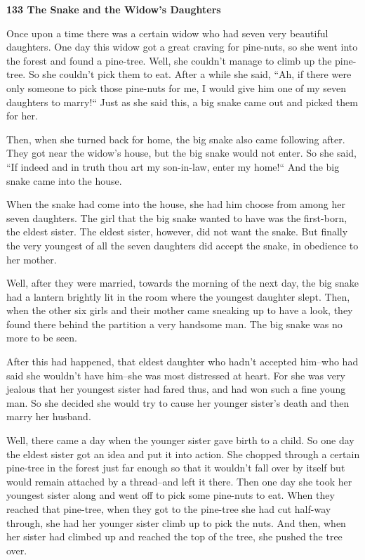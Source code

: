 
\textbf{133 The Snake and the Widow's Daughters}

Once upon a time there was a certain widow who had seven very beautiful daughters.
One day this widow got a great craving for pine-nuts, so she went into the forest
and found a pine-tree. Well, she couldn't manage to climb up the pine-tree. So
she couldn't pick them to eat. After a while she said, ``Ah, if there were
only someone to pick those pine-nuts for me, I would give him one of my seven daughters
to marry!`` Just as she said this, a big snake came out and picked them
for her.

Then, when she turned back for home, the big snake also came following after. They
got near the widow's house, but the big snake would not enter. So she said, ``If
indeed and in truth thou art my son-in-law, enter my home!`` And the big
snake came into the house.

When the snake had come into the house, she had him choose from among her seven
daughters. The girl that the big snake wanted to have was the first-born, the eldest
sister. The eldest sister, however, did not want the snake. But finally the very
youngest of all the seven daughters did accept the snake, in obedience to her mother.

Well, after they were married, towards the morning of the next day, the big snake
had a lantern brightly lit in the room where the youngest daughter slept. Then,
when the other six girls and their mother came sneaking up to have a look, they
found there behind the partition a very handsome man. The big snake was no more
to be seen.

After this had happened, that eldest daughter who hadn't accepted him--who had
said she wouldn't have him--she was most distressed at heart. For she was very
jealous that her youngest sister had fared thus, and had won such a fine young
man. So she decided she would try to cause her younger sister's death and then
marry her husband.

Well, there came a day when the younger sister gave birth to a child. So one day
the eldest sister got an idea and put it into action. She chopped through a certain
pine-tree in the forest just far enough so that it wouldn't fall over by itself
but would remain attached by a thread--and left it there. Then one day she took
her youngest sister along and went off to pick some pine-nuts to eat. When they
reached that pine-tree, when they got to the pine-tree she had cut half-way through,
she had her younger sister climb up to pick the nuts. And then, when her sister
had climbed up and reached the top of the tree, she pushed the tree over.

